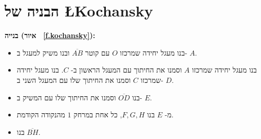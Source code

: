 


\section{הבניה של
\L{Kochansky}}\label{s.square-kochanski}

\textbf{בנייה (איור~
\ref{f.kochansky}):}
\begin{itemize}
\item
בנו מעגל יחידה שמרכזו 
$O$
עם קוטר
$\overline{AB}$
ובנו משיק למעגל ב-%
$A$.
\item
בנו מעגל יחידה שמרכזו
$A$
וסמנו את החיתוך עם המעגל הראשון ב-%
$C$.
בנו מעגל יחידה שמרכזו 
$C$
וסמנו את החיתוך שלו עם המעגל השני ב-%
$D$. 
\item
בנו
$\overline{OD}$
וסמנו את החיתוך שלו עם המשיק ב-%
$E$.
\item
מ-%
$E$
בנו
$F,G,H$,
כל אחת במרחק 
$1$
מהנקודה הקודמת.
\item
בנו
$\overline{BH}$.
\end{itemize}

